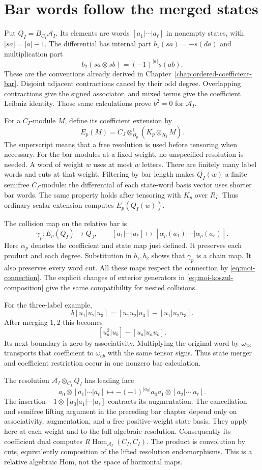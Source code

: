 \section{Bar words follow the merged states}

Put $Q_I=B_{C_I}\mathcal A_I$.
Its elements are words $[a_1|\cdots|a_\ell]$ in nonempty states,
with $|sa|=|a|-1$.
The differential has internal part $b_1(sa)=-s(da)$ and
multiplication part
\[
 b_2(sa\otimes sb)=(-1)^{|a|}s(ab).
\]
These are the conventions already derived in
Chapter~\ref{chap:ordered-coefficient-bar}.
Disjoint adjacent contractions cancel by their odd degree.
Overlapping contractions give the signed associator, and mixed
terms give the coefficient Leibniz identity.
Those same calculations prove $b^2=0$ for $\mathcal A_I$.

For a $C_I$-module $M$, define its coefficient extension by
\[
 E_p(M)=C_J\otimes_{B_p}^{\mathbb L}
                  (K_p\otimes_{R_I}M).
\]
The superscript means that a free resolution is used before
tensoring when necessary.
For the bar modules at a fixed weight, no unspecified resolution
is needed. A word of weight $w$ uses at most $w$ letters.
There are finitely many label words and cuts at that weight.
Filtering by bar length makes $Q_I(w)$ a finite semifree
$C_I$-module: the differential of each state-word basis vector
uses shorter bar words.
The same property holds after tensoring with $K_p$ over $R_I$.
Thus ordinary scalar extension computes $E_p(Q_I(w))$.

The collision map on the relative bar is
\[
 \gamma_p:E_p(Q_I)\longrightarrow Q_J,\qquad
 [a_1|\cdots|a_\ell]\longmapsto
 [\alpha_p(a_1)|\cdots|\alpha_p(a_\ell)].
\]
Here $\alpha_p$ denotes the coefficient and state map just defined.
It preserves each product and each degree.
Substitution in $b_1,b_2$ shows that $\gamma_p$ is a chain map.
It also preserves every word cut.
All these maps respect the connection by
\eqref{eq:moi-connection}.
The explicit changes of exterior generators in
\eqref{eq:moi-koszul-composition} give the same compatibility
for nested collisions.

For the three-label example,
\[
 b[u_1|u_2|u_3]=[u_1u_2|u_3]-[u_1|u_2u_3].
\]
After merging $1,2$ this becomes
\[
 [u_a^2|u_b]-[u_a|u_au_b].
\]
Its next boundary is zero by associativity.
Multiplying the original word by $\omega_{13}$ transports that
coefficient to $\omega_{ab}$ with the same tensor signs.
Thus state merger and coefficient restriction occur in one
nonzero bar calculation.

The resolution $\mathcal A_I\otimes_{C_I}Q_I$ has leading face
\[
 a_0\otimes[a_1|\cdots|a_\ell]\longmapsto
 -(-1)^{|a_0|}a_0a_1\otimes[a_2|\cdots|a_\ell].
\]
The insertion $-1\otimes[\overline a_0|a_1|\cdots|a_\ell]$
contracts its augmentation.
The cancellation and semifree lifting argument in the preceding
bar chapter depend only on associativity, augmentation, and a
free positive-weight state basis. They apply here at each weight
and to the full algebraic resolution.
Consequently its coefficient dual computes
$R\operatorname{Hom}_{\mathcal A_I}(C_I,C_I)$.
The product is convolution by cuts, equivalently composition of
the lifted resolution endomorphisms. This is a relative algebraic
Hom, not the space of horizontal maps.

